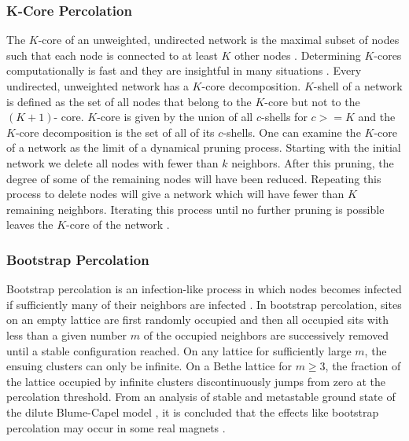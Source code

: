 		\subsubsection{K-Core Percolation}
		The $K$-core of an unweighted, undirected network is the maximal subset of nodes such that each node is connected to at least $K$ other nodes \cite{Seidman1983}. Determining $K$-cores computationally is fast and they are insightful in many situations \cite{Dorogovtsev2006,Csermely2013}. Every undirected, unweighted network has a $K$-core decomposition. $K$-shell of a network is defined as the set of all nodes that belong to the $K$-core but not to the $(K+1) $- core. $K$-core is given by the union of all $c$-shells for $c>=K$ and the $K$-core decomposition is the set of all of its $c$-shells. One can examine the $K$-core of a network as the limit of a dynamical pruning process. Starting with the initial network we delete all nodes with fewer than $k$ neighbors. After this pruning, the degree of some of the remaining nodes will have been reduced. Repeating this process to delete nodes will give a network which will have fewer than $K$ remaining neighbors. Iterating this process until no further pruning is possible leaves the $K$-core of the network \cite{Porter2016}.
		\subsubsection{Bootstrap Percolation}
		Bootstrap percolation is an infection-like process in which nodes becomes infected if sufficiently many of their neighbors are infected \cite{Adler1991}. In bootstrap percolation, sites on an empty lattice are first randomly occupied and then all occupied sits with less than a given number $m$ of the occupied neighbors are successively removed until a stable configuration reached. On any lattice for sufficiently large $m$, the ensuing clusters can  only be infinite. On a Bethe lattice for $m\geq 3$, the fraction of the lattice occupied by infinite clusters discontinuously jumps from zero at the percolation threshold. From an analysis of stable and metastable ground state of the dilute Blume-Capel model \cite{Blume1966}, it is concluded that the effects like bootstrap percolation may occur in some real magnets \cite{Chalupa1979}.
